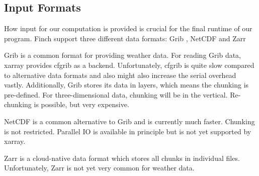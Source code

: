 \subsection{Input Formats}

How input for our computation is provided is crucial for the final runtime of our program.
Finch support three different data formats: Grib \cite{grib2022}, NetCDF \cite{netcdf2022} and Zarr \cite{zarr2022}

Grib is a common format for providing weather data.
For reading Grib data, xarray provides cfgrib \cite{cfgrib2022} as a backend.
Unfortunately, cfgrib is quite slow compared to alternative data formats and also might also increase the serial overhead vastly.
Additionally, Grib stores its data in layers, which means the chunking is pre-defined.
For three-dimensional data, chunking will be in the vertical.
Re-chunking is possible, but very expensive.

NetCDF is a common alternative to Grib and is currently much faster.
Chunking is not restricted.
Parallel IO is available in principle but is not yet supported by xarray.

Zarr is a cloud-native data format which stores all chunks in individual files.
Unfortunately, Zarr is not yet very common for weather data.